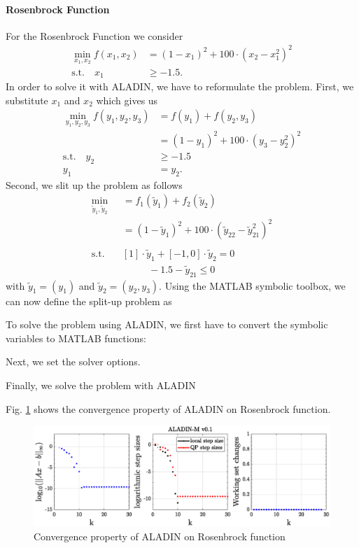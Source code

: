 \documentclass[]{scrartcl}
\begin{document}
\paragraph{Rosenbrock Function} 
For the Rosenbrock Function we consider
\begin{align*}
\min_{x_1, x_2} f(x_1, x_2) &= (1 - x_1)^2 + 100 \cdot (x_2 - x_1^2)^2 \\
\text{s.t.} \quad x_1 & \geq -1.5.
\end{align*}
In order to solve it with ALADIN, we have to reformulate the problem. First, we substitute $x_1$ and $x_2$ which gives us
\begin{align*}
\min_{y_1, y_2, y_3}f(y_1, y_2, y_3) & = f(y_1) + f(y_2, y_3)\\
 & = (1 - y_1)^2 + 100 \cdot (y_3 - y_2^2)^2 \\
\text{s.t.} \quad y_2 & \geq - 1.5\\
y_1 & = y_2. 
\end{align*}
Second, we slit up the problem as follows
\begin{align*}
\min_{\tilde{y}_1, \tilde{y}_2} &= f_1(\tilde{y}_1) + f_2(\tilde{y}_2) \\
& = (1 - \tilde{y}_1)^2 + 100 \cdot (\tilde{y}_{22} - \tilde{y}_{21}^2)^2 \\ 
\\
\text{s.t.} \quad & [1] \cdot \tilde{y}_1 + [-1, 0] \cdot \tilde{y}_2 = 0 \\
\quad \quad & \quad \quad \text{ } -1.5 - \tilde{y}_{21} \leq 0
\end{align*}
with $\tilde{y}_1 = (y_1)$ and $\tilde{y}_2 = (y_2, y_3)$.
Using the MATLAB symbolic toolbox, we can now define the split-up problem 
as 

To solve the problem using ALADIN, we first have to convert the symbolic variables to MATLAB functions:

Next, we set the solver options.

Finally, we solve the problem with ALADIN

Fig. \ref{fig:rosenbrock} shows the convergence property of ALADIN on Rosenbrock function.


\begin{figure}
	\centering
	\includegraphics[width=1\linewidth]{figures/rosenbrock.eps}
	\caption{Convergence property of ALADIN on Rosenbrock function}
	\label{fig:rosenbrock}
\end{figure}
\end{document}
